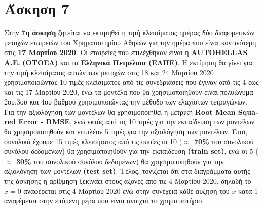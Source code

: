 \documentclass[Second Project.tex]{subfiles}
\begin{document}
\section{ Άσκηση 7 }
Στην \textbf{7η άσκηση} ζητείται να εκτιμηθεί η τιμή κλεισίματος ημέρας δύο διαφορετικών μετοχών εταιρειών του
Χρηματιστηρίου Αθηνών για την ημέρα που είναι κοντινότερη στις \textbf{17 Μαρτίου 2020}. Οι εταιρείες που 
επιλέχθηκαν είναι η \textlatin{\textbf{AUTOHELLAS A.E.}} \textbf{(ΟΤΟΕΛ)} και τα 
\textbf{Ελληνικά Πετρέλαια (ΕΛΠΕ)}. Η εκτίμηση θα γίνει για την τιμή κλεισίματος αυτών των μετοχών στις
18 και 24 Μαρτίου 2020 χρησιμοποιοώντας 10 τιμές κλείσιματος από τις συνεδριάσεις που έγιναν από τις 4 έως και τις
17 Μαρτίου 2020, ενώ τα μοντέλα που θα χρησιμοποιηθούν είναι πολυώνυμα 2ου,3ου και 4ου βαθμού χρησιμοποιώντας
την μέθοδο των ελαχίστων τετραγώνων. Για την αξιολόγηση των μοντέλων θα χρησιμοποιηθεί η μετρική 
\textlatin{\textbf{Root Mean Squared Error - RMSE}}, ενώ εκτός από τις 10 τιμές για την εκπαίδευση των μοντέλων
θα χρησιμοποιηθούν και επιπλέον 5 τιμές για την αξιολόγηση των μοντέλων. Έτσι, συνολικά έχουμε 15 τιμές 
κλεισίματος από τις οποίες οι 10 (\textbf{$\approx$ 70\%} του συνολικού συνόλου δεδομένων) θα χρησιμοποιηθούν για την 
εκπαίδευση \textlatin{\textbf{(train set)}}, ενώ οι 5 (\textbf{$\approx$ 30\%} του συνολικού συνόλου δεδομένων) θα 
χρησιμοποιηθούν για την αξιολόγηση των μοντέλων \textlatin{\textbf{(test set)}}. Τέλος, τονίζεται ότι στα 
διαγράμματα αυτής της άσκησης η αρίθμηση ξεκινάει στους άξονες από τις 4 Μαρτίου 2020, δηλαδή το $x=0$ 
αναφέρεται στις 4 Μαρτίου 2020 ενώ στην συνέχεια κάθε αύξηση του $x$ κατά 1 αναφέρεται στην επόμενη μέρα που
είναι ανοιχτό το χρηματιστήριο.
\end{document}
